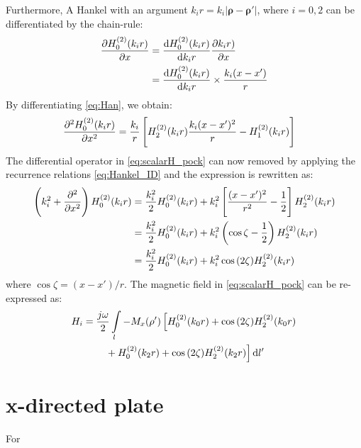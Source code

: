 \documentclass[11pt]{article}
\renewcommand{\v}[1]{\mathbf{#1}} %
\renewcommand{\O}{\omega}  %
\newcommand{\p}{\rho}  %
\newcommand{\x}{\times}  %
\renewcommand{\^}{\hat}  %
\newcommand*\diff{\mathop{}\!\mathrm{d}} %
\begin{document}
%
Furthermore, A Hankel with an argument $ k_i r = k_i|\v \p - \v \p'|$, where $i = 0,2$ can be differentiated by the chain-rule:
%
\begin{equation}
  \begin{split}
    \pdv{H_0^{(2)}(k_i r)}{x} &= \dv{H_0^{(2)}(k_i r)}{k_i r} \pdv{k_i r)}{x} \\
    &= \dv{H_0^{(2)}(k_i r)}{k_i r} \x \frac{k_i (x - x')}{r}
  \end{split}
  \label{eq:Han}
\end{equation}
%
By differentiating \eqref{eq:Han}, we obtain:
%
\begin{align}
  \pdv[2]{H_0^{(2)}(k_i r)}{x} &= \frac{k_i}{r} \left[H_2^{(2)}(k_i r) \frac{k_i (x - x')^2}{r} - H_1^{(2)}(k_i r) \right]
  \label{eq:difHan}
\end{align}
%
The differential operator in \eqref{eq:scalarH_pock} can now removed by applying the recurrence relations \eqref{eq:Hankel_ID} and the expression is rewritten as:
%
\begin{equation}
  \begin{split}
    \left(k_i^2 + \pdv[2]{}{x} \right) H_0^{(2)}(k_i r) &= \frac{k_i^2}{2} H_0^{(2)}(k_i r) + k_i^2 \left[ \frac{(x-x')^2}{r^2} - \frac{1}{2} \right] H_2^{(2)}(k_i r) \\
    &= \frac{k_i^2}{2} H_0^{(2)}(k_i r) + k_i^2 \left( \cos \zeta - \frac{1}{2} \right) H_2^{(2)}(k_i r) \\
    &= \frac{k_i^2}{2} H_0^{(2)}(k_i r) + k_i^2 \cos {(2\zeta)} H_2^{(2)}(k_i r)
  \end{split}
  \label{eq:Hankel_final}
\end{equation}
%
where $\cos \zeta = {(x-x')/r}$. The magnetic field in \eqref{eq:scalarH_pock} can be re-expressed as:
%
\begin{align}
  H_i &=  \frac{j \O}{2} \int\limits_{l} -M_x(\v \p') \left[ H_0^{(2)}(k_0 r) + \cos {(2 \zeta)} H_2^{(2)}(k_0 r) \right. \notag\\
  &\qquad \left. {} + H_0^{(2)}(k_2 r) + \cos {(2\zeta)} H_2^{(2)}(k_2 r)\right]\diff{l'}
  \label{eq:H_final}
\end{align}

\section{x-directed plate}

For
\end{document}
